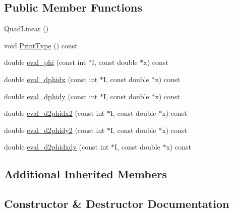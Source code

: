\subsection*{Public Member Functions}
\begin{DoxyCompactItemize}
\item 
\mbox{\hyperlink{classfemus_1_1_quad_linear_a7e730d0f2fc16b6913e254ebe5e17311}{Quad\+Linear}} ()
\item 
void \mbox{\hyperlink{classfemus_1_1_quad_linear_a8d265ad93c9d368a7c1af3a7edac1daf}{Print\+Type}} () const
\item 
double \mbox{\hyperlink{classfemus_1_1_quad_linear_aaec6a3a20ec48047ff1de4bbe75a5018}{eval\+\_\+phi}} (const int $\ast$I, const double $\ast$x) const
\item 
double \mbox{\hyperlink{classfemus_1_1_quad_linear_a8f5b2825197015a09664548848ceb0bf}{eval\+\_\+dphidx}} (const int $\ast$I, const double $\ast$x) const
\item 
double \mbox{\hyperlink{classfemus_1_1_quad_linear_a63d5770730442b7e6e5fe81e03a862e7}{eval\+\_\+dphidy}} (const int $\ast$I, const double $\ast$x) const
\item 
double \mbox{\hyperlink{classfemus_1_1_quad_linear_af75fece3983ee9169c452c287c6b8d09}{eval\+\_\+d2phidx2}} (const int $\ast$I, const double $\ast$x) const
\item 
double \mbox{\hyperlink{classfemus_1_1_quad_linear_acd036b93e46b4c610a08a71d0ed06745}{eval\+\_\+d2phidy2}} (const int $\ast$I, const double $\ast$x) const
\item 
double \mbox{\hyperlink{classfemus_1_1_quad_linear_a2dd33af4e3c5c38c77ed0b803cf8f099}{eval\+\_\+d2phidxdy}} (const int $\ast$I, const double $\ast$x) const
\end{DoxyCompactItemize}
\subsection*{Additional Inherited Members}


\subsection{Constructor \& Destructor Documentation}
\mbox{\label{classfemus_1_1_quad_linear_a7e730d0f2fc16b6913e254ebe5e17311}} 
